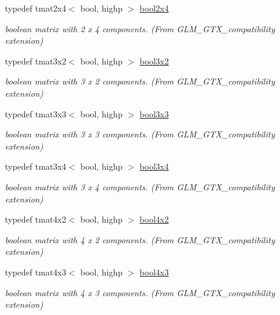 \begin{DoxyCompactItemize}
typedef tmat2x4$<$ bool, highp $>$ \hyperlink{group__gtx__compatibility_gacbd1c62dfad23155dba803d7c5125288}{bool2x4}
\begin{DoxyCompactList}\small\item\em boolean matrix with 2 x 4 components. (From G\+L\+M\+\_\+\+G\+T\+X\+\_\+compatibility extension) \end{DoxyCompactList}\item 
typedef tmat3x2$<$ bool, highp $>$ \hyperlink{group__gtx__compatibility_ga6a944ad10139c8915bf72a832273ff02}{bool3x2}
\begin{DoxyCompactList}\small\item\em boolean matrix with 3 x 2 components. (From G\+L\+M\+\_\+\+G\+T\+X\+\_\+compatibility extension) \end{DoxyCompactList}\item 
typedef tmat3x3$<$ bool, highp $>$ \hyperlink{group__gtx__compatibility_ga5c0ded80422867674cd651ab2261f2a3}{bool3x3}
\begin{DoxyCompactList}\small\item\em boolean matrix with 3 x 3 components. (From G\+L\+M\+\_\+\+G\+T\+X\+\_\+compatibility extension) \end{DoxyCompactList}\item 
typedef tmat3x4$<$ bool, highp $>$ \hyperlink{group__gtx__compatibility_gaf3777caf1e50112919be2939be05ae7e}{bool3x4}
\begin{DoxyCompactList}\small\item\em boolean matrix with 3 x 4 components. (From G\+L\+M\+\_\+\+G\+T\+X\+\_\+compatibility extension) \end{DoxyCompactList}\item 
typedef tmat4x2$<$ bool, highp $>$ \hyperlink{group__gtx__compatibility_ga2d956a9ea3d4c8e8ec12797c9d7cb677}{bool4x2}
\begin{DoxyCompactList}\small\item\em boolean matrix with 4 x 2 components. (From G\+L\+M\+\_\+\+G\+T\+X\+\_\+compatibility extension) \end{DoxyCompactList}\item 
typedef tmat4x3$<$ bool, highp $>$ \hyperlink{group__gtx__compatibility_gafd85fa864c89a6b1b4887d2790132c5c}{bool4x3}
\begin{DoxyCompactList}\small\item\em boolean matrix with 4 x 3 components. (From G\+L\+M\+\_\+\+G\+T\+X\+\_\+compatibility extension) \end{DoxyCompactList}\item 

\end{DoxyCompactItemize}
